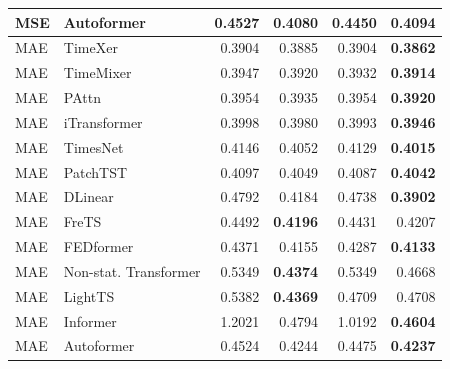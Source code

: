 \begin{longtable}{llrrrr}
MSE & Autoformer & 0.4527 & \textbf{0.4080} & 0.4450 & 0.4094 \\
\midrule
MAE & TimeXer & 0.3904 & 0.3885 & 0.3904 & \textbf{0.3862} \\
MAE & TimeMixer & 0.3947 & 0.3920 & 0.3932 & \textbf{0.3914} \\
MAE & PAttn & 0.3954 & 0.3935 & 0.3954 & \textbf{0.3920} \\
MAE & iTransformer & 0.3998 & 0.3980 & 0.3993 & \textbf{0.3946} \\
MAE & TimesNet & 0.4146 & 0.4052 & 0.4129 & \textbf{0.4015} \\
MAE & PatchTST & 0.4097 & 0.4049 & 0.4087 & \textbf{0.4042} \\
MAE & DLinear & 0.4792 & 0.4184 & 0.4738 & \textbf{0.3902} \\
MAE & FreTS & 0.4492 & \textbf{0.4196} & 0.4431 & 0.4207 \\
MAE & FEDformer & 0.4371 & 0.4155 & 0.4287 & \textbf{0.4133} \\
MAE & Non-stat. Transformer & 0.5349 & \textbf{0.4374} & 0.5349 & 0.4668 \\
MAE & LightTS & 0.5382 & \textbf{0.4369} & 0.4709 & 0.4708 \\
MAE & Informer & 1.2021 & 0.4794 & 1.0192 & \textbf{0.4604} \\
MAE & Autoformer & 0.4524 & 0.4244 & 0.4475 & \textbf{0.4237} \\
\end{longtable}
\endgroup

